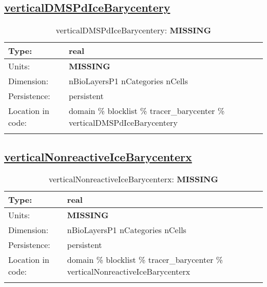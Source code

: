 \subsection[verticalDMSPdIceBarycentery]{\hyperref[sec:var_tab_tracer_barycenter]{verticalDMSPdIceBarycentery}}
\label{subsec:var_sec_tracer_barycenter_verticalDMSPdIceBarycentery}
\begin{center}
\begin{longtable}{| p{2.0in} | p{4.0in} |}
        \hline 
        Type: & real \\
        \hline 
        Units: & {\bf \color{red} MISSING} \\
        \hline 
        Dimension: & nBioLayersP1 nCategories nCells \\
        \hline 
        Persistence: & persistent \\
        \hline 
         Location in code: & domain \% blocklist \% tracer\_barycenter \% verticalDMSPdIceBarycentery \\
         \hline 
    \caption{verticalDMSPdIceBarycentery: {\bf \color{red} MISSING}}
\end{longtable}
\end{center}
\subsection[verticalNonreactiveIceBarycenterx]{\hyperref[sec:var_tab_tracer_barycenter]{verticalNonreactiveIceBarycenterx}}
\label{subsec:var_sec_tracer_barycenter_verticalNonreactiveIceBarycenterx}
\begin{center}
\begin{longtable}{| p{2.0in} | p{4.0in} |}
        \hline 
        Type: & real \\
        \hline 
        Units: & {\bf \color{red} MISSING} \\
        \hline 
        Dimension: & nBioLayersP1 nCategories nCells \\
        \hline 
        Persistence: & persistent \\
        \hline 
         Location in code: & domain \% blocklist \% tracer\_barycenter \% verticalNonreactiveIceBarycenterx \\
         \hline 
    \caption{verticalNonreactiveIceBarycenterx: {\bf \color{red} MISSING}}
\end{longtable}
\end{center}
